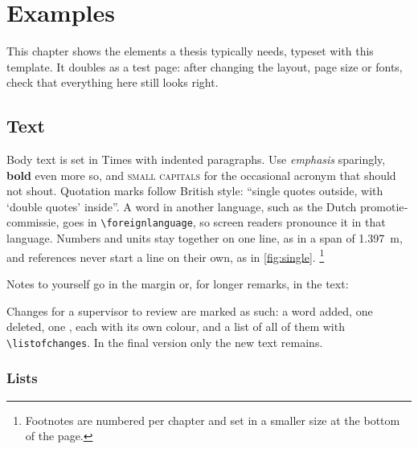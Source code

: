 \chapter{Examples}\label{ch:examples}
\chapterprecishere{}
\chapterprecistoc{}

This chapter shows the elements a thesis typically needs, typeset with this template. It doubles as a test page: after changing the layout, page size or fonts, check that everything here still looks right.

\section{Text}\label{sec:text}

Body text is set in Times with indented paragraphs. Use \emph{emphasis} sparingly, \textbf{bold} even more so, and \textsc{small capitals} for the occasional acronym that should not shout. Quotation marks follow British style: \enquote{single quotes outside, with \enquote{double quotes} inside}. A word in another language, such as the Dutch \foreignlanguage{dutch}{promotiecommissie}, goes in \verb|\foreignlanguage|, so screen readers pronounce it in that language. Numbers and units stay together on one line, as in a span of \qty{1.397}{\metre}, and references never start a line on their own, as in \cref{fig:single}.%
\footnote{Footnotes are numbered per chapter and set in a smaller size at the bottom of the page.}

Notes to yourself go in the margin or, for longer remarks, in the text:

Changes for a supervisor to review are marked as such: a word  added, one  deleted, one , each with its own colour, and a list of all of them with \verb|\listofchanges|. In the final version only the new text remains.

\subsection{Lists}

